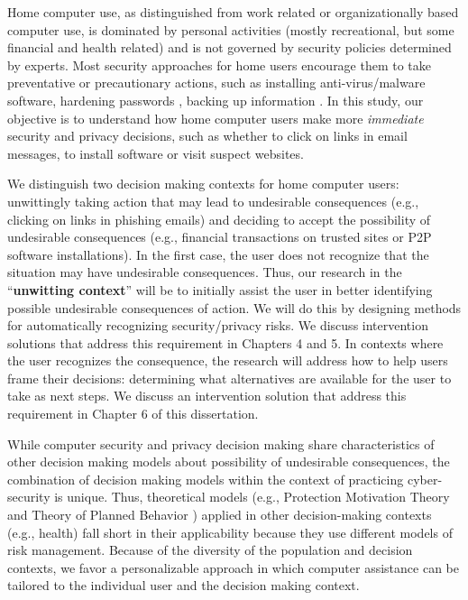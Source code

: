 Home computer use, as distinguished from work related or organizationally based computer
use, is dominated by personal activities (mostly recreational, but some financial and health related) and is not governed by security policies determined by experts. 
Most security approaches for home users encourage them to take preventative or precautionary actions, such as installing anti-virus/malware software, hardening passwords \cite{chiasson2008}, backing up information \cite{dupuis2012}. 
In this study, our objective is to understand how home computer users
make more \textit{immediate} security and privacy decisions, such as whether to click on links in email messages, to install software or visit suspect websites. 

We distinguish two decision making contexts for home computer users: unwittingly taking action that may lead to undesirable consequences (e.g., clicking on links in phishing emails) and deciding to accept the possibility of undesirable consequences (e.g., financial transactions on trusted sites or P2P software installations). 
In the first case, the user does not recognize that the situation may have undesirable
consequences. 
Thus, our research in the ``\textbf{unwitting context}'' will be to initially assist the user in better identifying possible undesirable consequences of action. 
We will do this by designing methods for automatically recognizing security/privacy risks. 
We discuss intervention solutions that address this requirement in Chapters 4 and 5.
In contexts where the user recognizes the consequence, the research will address how to help users frame their decisions: determining what alternatives are available for the user to take as next steps.
We discuss an intervention solution that address this requirement in Chapter 6 of this dissertation.


While computer security and privacy decision making share characteristics of other decision making models about possibility of undesirable consequences, the combination of decision making models within the context of practicing cyber-security is unique. 
Thus, theoretical models (e.g., Protection Motivation Theory \cite{rogers1997} and Theory of Planned Behavior \cite{ajzen1991}) applied in other decision-making contexts (e.g., health) fall short in their applicability because they use different models of risk management. 
Because of the diversity of the population and decision contexts, we favor a personalizable approach in which computer assistance can be tailored to the individual user and the decision making context.



